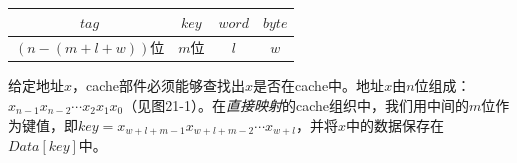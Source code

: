 \documentclass[cn,11pt,chinese]{elegantbook}
\begin{document}
\begin{center}
\begin{tabular}{|c|c|c|c|}
  \hline
  $tag$ & $key$ & $word$ & $byte$ \\
  \hline
  \multicolumn{1}{c}{$(n-(m+l+w))$位} & \multicolumn{1}{c}{$m$位} & \multicolumn{1}{c}{$l$} & \multicolumn{1}{c}{$w$} \\
\end{tabular}
\end{center}

给定地址$x$，cache部件必须能够查找出$x$是否在cache中。地址$x$由$n$位组成：$x_{n-1}x_{n-2}\cdots x_2x_1x_0$（见图21-1）。在\textit{直接映射}的cache组织中，我们用中间的$m$位作为键值，即$key=x_{w+l+m-1}x_{w+l+m-2}\cdots x_{w+l}$，并将$x$中的数据保存在$Data[key]$中。
\end{document}
